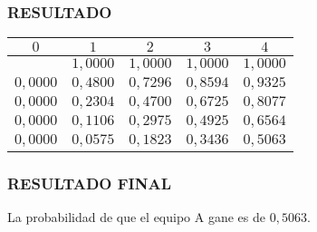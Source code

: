 \documentclass[10]{beamer}
\begin{document}
\begin{frame}
\color{white}
\frametitle{RESULTADO}
\begin{table}
 \begin{tabular}{ c | c  | c  | c  | c }
 \\  $0$ & $1$   & $2$   & $3$   & $4$  \\ 
 \hline \hline 
   & $1,0000$   & $1,0000$   & $1,0000$   & $1,0000$   \\ 
 $0,0000$ & $0,4800$   & $0,7296$   & $0,8594$   & $0,9325$   \\ 
 $0,0000$ & $0,2304$   & $0,4700$   & $0,6725$   & $0,8077$   \\ 
 $0,0000$ & $0,1106$   & $0,2975$   & $0,4925$   & $0,6564$   \\ 
 $0,0000$ & $0,0575$   & $0,1823$   & $0,3436$   & $0,5063$   \\ 
 \end{tabular}
 \end{table}
 \end{frame} 
\begin{frame}
\color{white}
\frametitle{RESULTADO FINAL}
La probabilidad de que el equipo A gane es de $0,5063$. \\\end{frame} 
\end{document}

